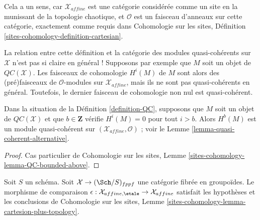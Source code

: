 \noindent
Cela a un sens, car $\mathcal{X}_{affine}$ est une catégorie considérée
comme un site en la munissant de la topologie chaotique, et
$\mathcal{O}$ est un faisceau d'anneaux sur cette catégorie, exactement comme requis dans
Cohomologie sur les sites, Définition \ref{sites-cohomology-definition-cartesian}.

\medskip\noindent
La relation entre cette définition et la catégorie des modules quasi-cohérents
sur $\mathcal{X}$ n'est pas si claire en général ! Supposons par exemple
que $M$ soit un objet de $\mathit{QC}(\mathcal{X})$. Les faisceaux de cohomologie
$H^i(M)$ de $M$ sont alors des (pré)faisceaux de $\mathcal{O}$-modules sur
$\mathcal{X}_{affine}$, mais ils ne sont pas quasi-cohérents en général. Toutefois, le dernier
faisceau de cohomologie non nul est quasi-cohérent.

\begin{lemma}
\label{lemma-QC-bounded-above}
Dans la situation de la Définition \ref{definition-QC}, supposons que
$M$ soit un objet de $\mathit{QC}(\mathcal{X})$ et que $b \in \mathbf{Z}$
vérifie $H^i(M) = 0$ pour tout $i > b$.
Alors $H^b(M)$ est un module quasi-cohérent sur
$(\mathcal{X}_{affine}, \mathcal{O})$ ; voir le
Lemme \ref{lemma-quasi-coherent-alternative}.
\end{lemma}

\begin{proof}
Cas particulier de
Cohomologie sur les sites, Lemme \ref{sites-cohomology-lemma-QC-bounded-above}.
\end{proof}

\begin{lemma}
\label{lemma-QC-compare}
Soit $S$ un schéma. Soit $\mathcal{X} \to (\Sch/S)_{fppf}$ une catégorie
fibrée en groupoïdes. Le morphisme de comparaison
$\epsilon : \mathcal{X}_{affine, \etale} \to \mathcal{X}_{affine}$
satisfait les hypothèses et les conclusions de Cohomologie sur les sites, Lemme
\ref{sites-cohomology-lemma-cartesion-plus-topology}.
\end{lemma}

